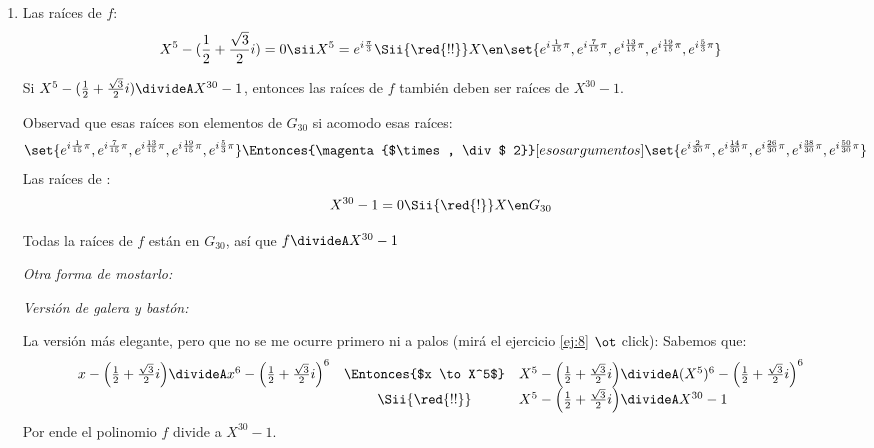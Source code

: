 \begin{enumerate}[label=\alph*)]
  \item
        Las raíces de $f$:
        $$
          X^5 - (\frac{1}{2} + \frac{\sqrt{3}}{2}i ) = 0
          \sii X^5 = e^{i \frac{\pi}{3}}
          \Sii{\red{!!}}
          X \en
          \set{
            e^{i \frac{1}{15} \pi},
            e^{i \frac{7}{15} \pi},
            e^{i \frac{13}{15} \pi},
            e^{i \frac{19}{15} \pi},
            e^{i \frac{5}{3} \pi}
          }
        $$

        Si $X^5 - (\frac{1}{2} + \frac{\sqrt{3}}{2}i )  \divideA X^{30} - 1$,
        entonces  las raíces de $f$ también deben ser raíces de $X^{30} - 1$.

        Observad que esas raíces son elementos de $G_{30}$ si acomodo esas raíces:
        $$
          \set{
            e^{i \frac{1}{15} \pi},
            e^{i \frac{7}{15} \pi},
            e^{i \frac{13}{15} \pi},
            e^{i \frac{19}{15} \pi},
            e^{i \frac{5}{3} \pi}
          }
          \Entonces{\magenta{$\times, \div$ 2}}[esos argumentos]
          \set{
            e^{i \frac{2}{30} \pi},
            e^{i \frac{14}{30} \pi},
            e^{i \frac{26}{30} \pi},
            e^{i \frac{38}{30} \pi},
            e^{i \frac{50}{30} \pi}
          }
        $$
        Las raíces de :
        $$
          X^{30} - 1 = 0
          \Sii{\red{!}}
          X \en G_{30}
        $$

        Todas la raíces de $f$ están en $G_{30}$, así que $f \divideA X^{30} - 1$

        \bigskip

        \textit{Otra forma de mostarlo:}

        \textit{Versión de galera y bastón:}

        La versión más elegante, pero que no se me ocurre primero ni a palos (mirá el ejercicio \ref{ej:8} {\tiny$\ot$ click}):
        Sabemos que:
        $$
          \begin{array}{rcl}
            x - \Big(\frac{1}{2} + \frac{\sqrt{3}}{2}i \Big) \divideA x^6 - \Big(\frac{1}{2} + \frac{\sqrt{3}}{2}i\Big)^6
             & \Entonces{$x \to X^5$} &
            X^5 - \Big(\frac{1}{2} + \frac{\sqrt{3}}{2}i \Big) \divideA (X^{5})^6 - \Big(\frac{1}{2} + \frac{\sqrt{3}}{2}i \Big)^6 \\
             & \Sii{\red{!!}}         &
            X^5 - \Big(\frac{1}{2} + \frac{\sqrt{3}}{2}i \Big) \divideA X^{30} - 1
          \end{array}
        $$
        Por ende el polinomio $f$ divide a $X^{30} - 1$.


\end{enumerate}
